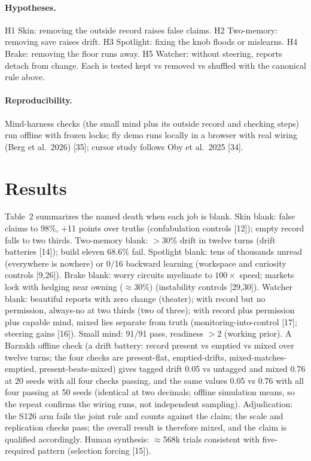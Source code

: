 \documentclass[11pt,a4paper]{article}
\begin{document}
\paragraph{Hypotheses.} H1 Skin: removing the outside record raises false claims. H2 Two-memory: removing save raises drift. H3 Spotlight: fixing the knob floods or mislearns. H4 Brake: removing the floor runs away. H5 Watcher: without steering, reports detach from change. Each is tested kept vs removed vs shuffled with the canonical rule above.
\paragraph{Reproducibility.} Mind-harness checks (the small mind plus its outside record and checking steps) run offline with frozen locks; fly demo runs locally in a browser with real wiring (Berg et al.\ 2026) [35]; cursor study follows Oby et al.\ 2025 [34].

\section{Results}
Table~2 summarizes the named death when each job is blank. Skin blank: false claims to 98\%, +11 points over truths (confabulation controls [12]); empty record falls to two thirds. Two-memory blank: $>30$\% drift in twelve turns (drift batteries [14]); build eleven 68.6\% fail. Spotlight blank: tens of thousands unread (everywhere is nowhere) or 0/16 backward learning (workspace and curiosity controls [9,26]). Brake blank: worry circuits myelinate to $100\times$ speed; markets lock with hedging near owning ($\approx 30$\%) (instability controls [29,30]). Watcher blank: beautiful reports with zero change (theater); with record but no permission, always-no at two thirds (two of three); with record plus permission plus capable mind, mixed lies separate from truth (monitoring-into-control [17]; steering gains [16]). Small mind: 91/91 pass, readiness $>2$ (working prior). A Barzakh offline check (a drift battery: record present vs emptied vs mixed over twelve turns; the four checks are present-flat, emptied-drifts, mixed-matches-emptied, present-beats-mixed) gives tagged drift 0.05 vs untagged and mixed 0.76 at 20 seeds with all four checks passing, and the same values 0.05 vs 0.76 with all four passing at 50 seeds (identical at two decimals; offline simulation means, so the repeat confirms the wiring runs, not independent sampling). Adjudication: the S126 arm fails the joint rule and counts against the claim; the scale and replication checks pass; the overall result is therefore mixed, and the claim is qualified accordingly. Human synthesis: $\approx$568k trials consistent with five-required pattern (selection forcing [15]).
\end{document}
